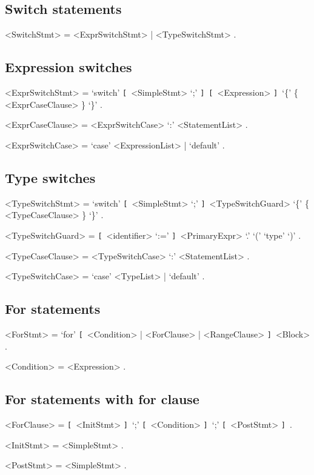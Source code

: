 \documentclass{article}
\def\lopt{\synshortsoff\texttt{[}\synshorts~}
\def\ropt{\synshortsoff\texttt{]}\synshorts~}
\begin{document}
\subsection*{Switch statements}
\begin{grammar}
	<SwitchStmt> = <ExprSwitchStmt> | <TypeSwitchStmt> .
\end{grammar}

\subsection*{Expression switches}
\begin{grammar}
	<ExprSwitchStmt> = `switch' \lopt <SimpleStmt> `;' \ropt \lopt <Expression> \ropt `\{' \{ <ExprCaseClause> \} `\}' .

	<ExprCaseClause> = <ExprSwitchCase> `:' <StatementList> .

	<ExprSwitchCase> = `case' <ExpressionList> | `default' .
\end{grammar}

\subsection*{Type switches}
\begin{grammar}
	<TypeSwitchStmt>  = `switch' \lopt <SimpleStmt> `;' \ropt <TypeSwitchGuard> `\{' \{ <TypeCaseClause> \} `\}' .

	<TypeSwitchGuard> = \lopt <identifier> `:=' \ropt <PrimaryExpr> `.' `(' `type' `)' .

	<TypeCaseClause> = <TypeSwitchCase> `:' <StatementList> .

	<TypeSwitchCase> = `case' <TypeList> | `default' .
\end{grammar}



\subsection*{For statements}
\begin{grammar}
	<ForStmt> = `for' \lopt <Condition> | <ForClause> | <RangeClause> \ropt <Block> .

	<Condition> = <Expression> .
\end{grammar}

\subsection*{For statements with for clause}
\begin{grammar}
	<ForClause> = \lopt <InitStmt> \ropt `;' \lopt <Condition> \ropt `;' \lopt <PostStmt> \ropt .

	<InitStmt> = <SimpleStmt> .

	<PostStmt> = <SimpleStmt> .
\end{grammar}
\end{document}

